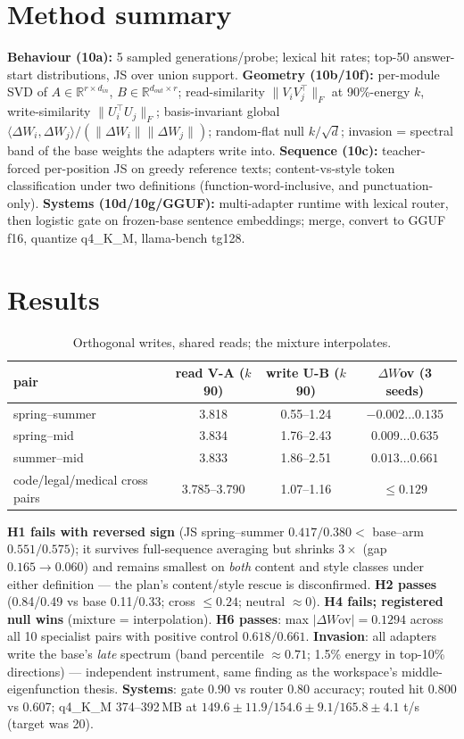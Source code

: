 \documentclass[11pt, a4paper]{article}
\begin{document}
\section{Method summary}
\textbf{Behaviour (10a):} 5 sampled generations/probe; lexical hit rates; top-50
answer-start distributions, JS over union support.
\textbf{Geometry (10b/10f):} per-module SVD of $A\in\mathbb{R}^{r\times d_{in}}$,
$B\in\mathbb{R}^{d_{out}\times r}$; read-similarity $\|V_i V_j^{\!\top}\|_F$ at
90\%-energy $k$, write-similarity $\|U_i^{\!\top}U_j\|_F$; basis-invariant global
$\langle\Delta W_i,\Delta W_j\rangle/(\|\Delta W_i\|\|\Delta W_j\|)$; random-flat null
$k/\sqrt d$; invasion = spectral band of the base weights the adapters write into.
\textbf{Sequence (10c):} teacher-forced per-position JS on greedy reference texts;
content-vs-style token classification under two definitions (function-word-inclusive,
and punctuation-only).
\textbf{Systems (10d/10g/GGUF):} multi-adapter runtime with lexical router, then logistic
gate on frozen-base sentence embeddings; merge, convert to GGUF f16, quantize q4\_K\_M,
llama-bench tg128.

\section{Results}
\begin{table}[h]\centering\small
\begin{tabular}{@{}lccc@{}}
\toprule
pair & read V-A ($k$90) & write U-B ($k$90) & $\Delta W$ov (3 seeds)\\
\midrule
spring--summer & 3.818 & 0.55--1.24 & $-0.002\ldots0.135$\\
spring--mid    & 3.834 & 1.76--2.43 & $0.009\ldots0.635$\\
summer--mid    & 3.833 & 1.86--2.51 & $0.013\ldots0.661$\\
code/legal/medical cross pairs & 3.785--3.790 & 1.07--1.16 & $\le 0.129$\\
\bottomrule
\end{tabular}
\caption{Orthogonal writes, shared reads; the mixture interpolates.}
\end{table}

\textbf{H1 fails with reversed sign} (JS spring--summer $0.417/0.380 <$ base--arm
$0.551/0.575$); it survives full-sequence averaging but shrinks $3\times$ (gap
$0.165\to0.060$) and remains smallest on \emph{both} content and style classes under
either definition --- the plan's content/style rescue is disconfirmed.
\textbf{H2 passes} (0.84/0.49 vs base 0.11/0.33; cross $\le 0.24$; neutral $\approx 0$).
\textbf{H4 fails; registered null wins} (mixture = interpolation).
\textbf{H6 passes}: max $|\Delta W\text{ov}|=0.1294$ across all 10 specialist pairs with
positive control $0.618/0.661$.
\textbf{Invasion}: all adapters write the base's \emph{late} spectrum (band percentile
$\approx 0.71$; 1.5\% energy in top-10\% directions) --- independent instrument, same
finding as the workspace's middle-eigenfunction thesis.
\textbf{Systems}: gate 0.90 vs router 0.80 accuracy; routed hit 0.800 vs 0.607;
q4\_K\_M 374--392\,MB at $149.6\pm11.9$/$154.6\pm9.1$/$165.8\pm4.1$ t/s (target was 20).
\end{document}
